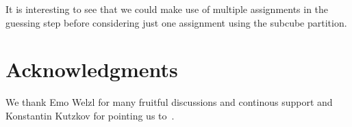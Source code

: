 It is interesting to see that we could make use of multiple assignments in the guessing step before considering just one assignment using the subcube partition.
\section*{Acknowledgments}
We thank Emo Welzl for many fruitful discussions and continous support and Konstantin Kutzkov for pointing us to~\cite{istt10}.
